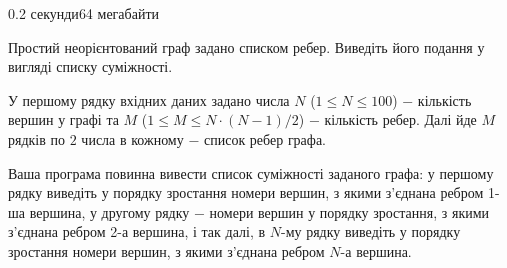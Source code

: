 \begin{problem}{}{}{}{0.2 секунди}{64 мегабайти}

Простий неорієнтований граф задано списком ребер. Виведіть його подання у вигляді списку суміжності.

\InputFile
У першому рядку вхідних даних задано числа $N$ ($1 \le N \le 100$) $-$ кількість вершин у графі та 
$M$ ($1 \le M \le N\cdot(N-1)/2$) $-$ кількість ребер.
Далі йде $M$ рядків по $2$ числа в кожному $-$ список ребер графа. 

\OutputFile
Ваша програма повинна вивести список суміжності заданого графа: у першому рядку виведіть у порядку зростання
номери вершин, з якими з'єднана ребром 1-ша вершина, у другому рядку $-$ номери вершин у порядку зростання,
з якими з'єднана ребром 2-а вершина, і так далі, в $N$-му рядку виведіть у порядку зростання
номери вершин, з якими з'єднана ребром $N$-а вершина.


\Example

\begin{example}
\end{example}

\end{problem}


